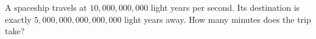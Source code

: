 A spaceship travels at $10{,}000{,}000{,}000$ light years per second. Its destination is exactly $5{,}000{,}000{,}000{,}000{,}000$ light years away. How many minutes does the trip take?
